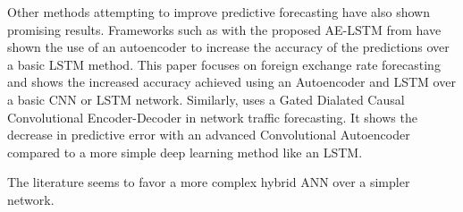 Other methods attempting to improve predictive forecasting have also shown promising results.
Frameworks such as with the proposed AE-LSTM from \cite{VanHoa2021} have shown the use of an autoencoder to increase the accuracy of the predictions over a basic LSTM method.
This paper focuses on foreign exchange rate forecasting and shows the increased accuracy achieved using an Autoencoder and LSTM over a basic CNN or LSTM network.
Similarly, \cite{Zhang2020} uses a Gated Dialated Causal Convolutional Encoder-Decoder in network traffic forecasting.
It shows the decrease in predictive error with an advanced Convolutional Autoencoder compared to a more simple deep learning method like an LSTM.

The literature seems to favor a more complex hybrid ANN over a simpler network.


\iffalse
  The proposed problem-space has data with high fluctuations and noise.
  In order to increase the predictive abilities of a model, a method well suited for working with data with high noise should be selected.
  A CNN-AE model should be able to solve this problem.
  The CNN is able to extract the spatial features of the data while the AE can filter out the noise and fluctuations in the data.
  By then adding a LSTM network at the end, the model should be able to extract the temoral featrues from the data.
  This hybrid framework should therefore be well suited for the task at hand.
\fi




